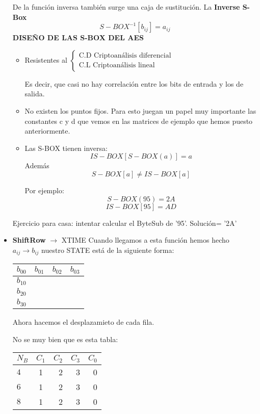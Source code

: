 \begin{itemize}
	De la función inversa también surge una caja de sustitución. La \textbf{Inverse S-Box}
	$$S-BOX^{-1}[b_{ij}] = a_{ij}$$
	\textbf{DISEÑO DE LAS S-BOX DEL AES}
	\begin{itemize}
		\item Resistentes al $\begin{cases}
			\text{C.D Criptoanálisis diferencial}\\
			\text{C.L Criptoanálisis lineal}
		\end{cases}$
		
		Es decir, que casi no hay correlación entre los bits de entrada y los de salida.
		
		\item No existen los puntos fijos. Para esto juegan un papel muy importante las constantes c y d que vemos en las matrices de ejemplo que hemos puesto anteriormente.
		
		\item Las S-BOX tienen inversa: 
		$$IS-BOX[S-BOX(a)] = a$$
		Además $$S-BOX[a]\neq IS-BOX[a]$$
		
		Por ejemplo:
		 $$S-BOX(95) = 2A$$
		 $$IS-BOX[95]=  AD$$
	\end{itemize}
	Ejercicio para casa: intentar calcular el ByteSub de '95'. Solución= '2A'
	\item \textbf{ShiftRow} $\rightarrow$ XTIME
	Cuando llegamos a esta función hemos hecho $a_{ij} \rightarrow b_{ij}$ nuestro STATE está de la siguiente forma:
	
	\begin{center}
		
		\begin{tabular}{l | c | r | r}
			$b_{00}$ & $b_{01}$ & $b_{02}$ & $b_{03}$\\
			\hline
			$b_{10}$ &   &   &  \\
			\hline
			$b_{20}$ &   &   & \\
			\hline
			$b_{30}$ &   &   & 
			
		\end{tabular}
	\end{center}
	
	Ahora hacemos el desplazamieto de cada fila.
	
	No se muy bien que es esta tabla:
	
		\begin{center}
			
			\begin{tabular}{l | c | r | r | r}
				$N_B$ & $C_1$ & $C_2$ & $C_3$ & $C_0$\\
				\hline
				$4$ & 1  &  2 & 3  &  0 \\
				\hline
				$6$ &  1 &  2 &  3 &  0  \\
				\hline
				$8$ &   1& 2  &  3 & 0 
				

\end{tabular}
\end{center}
\end{itemize}
